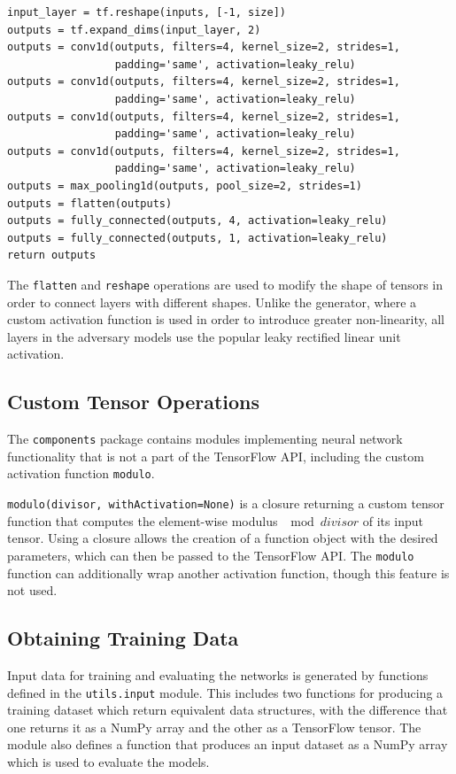 \documentclass[12pt, titlepage]{report}
\theoremstyle{definition}
\begin{document}
\begin{verbatim}
input_layer = tf.reshape(inputs, [-1, size])
outputs = tf.expand_dims(input_layer, 2)
outputs = conv1d(outputs, filters=4, kernel_size=2, strides=1, 
                 padding='same', activation=leaky_relu)
outputs = conv1d(outputs, filters=4, kernel_size=2, strides=1, 
                 padding='same', activation=leaky_relu)
outputs = conv1d(outputs, filters=4, kernel_size=2, strides=1, 
                 padding='same', activation=leaky_relu)
outputs = conv1d(outputs, filters=4, kernel_size=2, strides=1, 
                 padding='same', activation=leaky_relu)
outputs = max_pooling1d(outputs, pool_size=2, strides=1)
outputs = flatten(outputs)
outputs = fully_connected(outputs, 4, activation=leaky_relu)
outputs = fully_connected(outputs, 1, activation=leaky_relu)
return outputs
\end{verbatim}

The \texttt{flatten} and \texttt{reshape} operations are used to modify the shape of tensors in order to connect layers with different shapes. Unlike the generator, where a custom activation function is used in order to introduce greater non-linearity, all layers in the adversary models use the popular leaky rectified linear unit activation.



\subsection{Custom Tensor Operations}\label{subsection:custom_ops}
The \texttt{components} package contains modules implementing neural network functionality that is not a part of the TensorFlow API, including the custom activation function \texttt{modulo}.

\texttt{modulo(divisor, withActivation=None)} is a closure returning a custom tensor function that computes the element-wise modulus $\mod{divisor}$ of its input tensor. Using a closure allows the creation of a function object with the desired parameters, which can then be passed to the TensorFlow API. The \texttt{modulo} function can additionally wrap another activation function, though this feature is not used.


\subsection{Obtaining Training Data}
Input data for training and evaluating the networks is generated by functions defined in the \texttt{utils.input} module. This includes two functions for producing a training dataset which return equivalent data structures, with the difference that one returns it as a NumPy array and the other as a TensorFlow tensor. The module also defines a function that produces an input dataset as a NumPy array which is used to evaluate the models.
\end{document}
